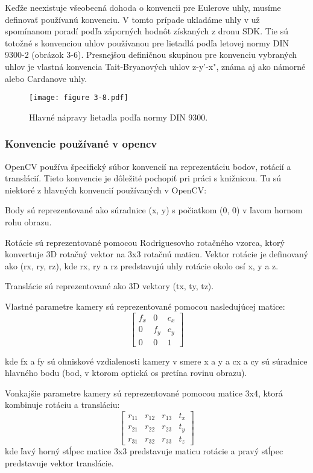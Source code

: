 {Keďže neexistuje všeobecná dohoda o konvencii pre Eulerove uhly, musíme definovať používanú konvenciu. V tomto prípade ukladáme uhly v už spomínanom poradí podľa záporných hodnôt získaných z dronu SDK. Tie sú totožné s konvenciou uhlov používanou pre lietadlá podľa letovej normy DIN 9300-2 (obrázok 3-6). Presnejšou definičnou skupinou pre konvenciu vybraných uhlov je vlastná konvencia Tait-Bryanových uhlov z-y'-x", známa aj ako námorné alebo Cardanove uhly.
\begin{figure}[ht!]
    \centering
    \texttt{[image: figure 3-8.pdf]}
    \caption{Hlavné nápravy lietadla podľa normy DIN 9300.}
    \label{o:3-8} 
\end{figure} 

\subsubsection{Konvencie používané v opencv}
OpenCV používa špecifický súbor konvencií na reprezentáciu bodov, rotácií a translácií. Tieto konvencie je dôležité pochopiť pri práci s knižnicou. Tu sú niektoré z hlavných konvencií používaných v OpenCV:

Body sú reprezentované ako súradnice (x, y) s počiatkom (0, 0) v ľavom hornom rohu obrazu.

Rotácie sú reprezentované pomocou Rodriguesovho rotačného vzorca, ktorý konvertuje 3D rotačný vektor na 3x3 rotačnú maticu. Vektor rotácie je definovaný ako (rx, ry, rz), kde rx, ry a rz predstavujú uhly rotácie okolo osí x, y a z.

Translácie sú reprezentované ako 3D vektory (tx, ty, tz).

Vlastné parametre kamery sú reprezentované pomocou nasledujúcej matice:
\begin{equation}
\begin{bmatrix}
f_x & 0 & c_x \\
0 & f_y & c_y \\
0 & 0 & 1
\end{bmatrix}
\end{equation}

kde fx a fy sú ohniskové vzdialenosti kamery v smere x a y a cx a cy sú súradnice hlavného bodu (bod, v ktorom optická os pretína rovinu obrazu).

Vonkajšie parametre kamery sú reprezentované pomocou matice 3x4, ktorá kombinuje rotáciu a transláciu:
\begin{equation}
\begin{bmatrix}
r_{11} & r_{12} & r_{13} & t_x \\
r_{21} & r_{22} & r_{23} & t_y \\
r_{31} & r_{32} & r_{33} & t_z
\end{bmatrix}
\end{equation}
kde ľavý horný stĺpec matice 3x3 predstavuje maticu rotácie a pravý stĺpec predstavuje vektor translácie.

}

